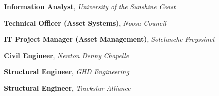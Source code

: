 %
%
%


\begin{scholarship}

					{\textbf{Information Analyst}, \textit{University of the Sunshine Coast}}

					{\textbf{Technical Officer (Asset Systems)}, \textit{Noosa Council}}
					
					{\textbf{IT Project Manager (Asset Management)}, \textit{Soletanche-Freyssinet}}

					{\textbf{Civil Engineer}, \textit{Newton Denny Chapelle}}
					
					{\textbf{Structural Engineer}, \textit{GHD Engineering}}	
					
					{\textbf{Structural Engineer}, \textit{Trackstar Alliance}}			
\end{scholarship}